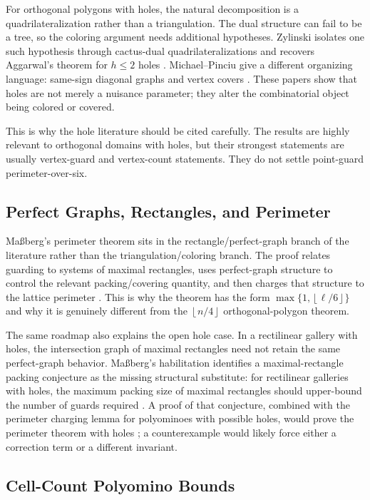 \documentclass[11pt]{article}
\newcommand{\floor}[1]{\left\lfloor #1 \right\rfloor}
\begin{document}
For orthogonal polygons with holes, the natural decomposition is a
quadrilateralization rather than a triangulation.  The dual structure can fail
to be a tree, so the coloring argument needs additional hypotheses.  Zylinski
isolates one such hypothesis through cactus-dual quadrilateralizations and
recovers Aggarwal's theorem for $h \leq 2$ holes
\cite{Zylinski2006}.  Michael--Pinciu give a different organizing language:
same-sign diagonal graphs and vertex covers \cite{MichaelPinciu2016}.  These
papers show that holes are not merely a nuisance parameter; they alter the
combinatorial object being colored or covered.

This is why the hole literature should be cited carefully.  The results are
highly relevant to orthogonal domains with holes, but their strongest
statements are usually vertex-guard and vertex-count statements.  They do not
settle point-guard perimeter-over-six.

\subsection{Perfect Graphs, Rectangles, and Perimeter}

Ma{\ss}berg's perimeter theorem sits in the rectangle/perfect-graph branch of
the literature rather than the triangulation/coloring branch.  The proof
relates guarding to systems of maximal rectangles, uses perfect-graph
structure to control the relevant packing/covering quantity, and then charges
that structure to the lattice perimeter \cite[Section~4]{Massberg2014}.  This
is why the theorem has the form $\max\{1,\floor{\ell/6}\}$ and why it is
genuinely different from the $\floor{n/4}$ orthogonal-polygon theorem.

The same roadmap also explains the open hole case.  In a rectilinear gallery
with holes, the intersection graph of maximal rectangles need not retain the
same perfect-graph behavior.  Ma{\ss}berg's habilitation identifies a
maximal-rectangle packing conjecture as the missing structural substitute:
for rectilinear galleries with holes, the maximum packing size of maximal
rectangles should upper-bound the number of guards required
\cite[Conj.~6.10]{MassbergHabilitation}.  A proof of that conjecture, combined
with the perimeter charging lemma for polyominoes with possible holes, would
prove the perimeter theorem with holes \cite[Lem.~6.9]{MassbergHabilitation};
a counterexample would likely force either a correction term or a different
invariant.

\subsection{Cell-Count Polyomino Bounds}
\end{document}

